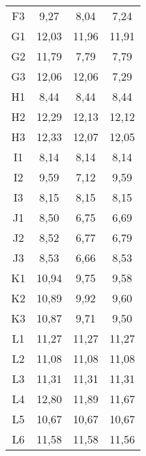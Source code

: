 \begin{center}
\begin{longtable}{cccc}
    F3    & 9,27  & 8,04  & 7,24 \\
    G1    & 12,03 & 11,96 & 11,91 \\
    G2    & 11,79 & 7,79  & 7,79 \\
    G3    & 12,06 & 12,06 & 7,29 \\
    H1    & 8,44  & 8,44  & 8,44 \\
    H2    & 12,29 & 12,13 & 12,12 \\
    H3    & 12,33 & 12,07 & 12,05 \\
    I1    & 8,14  & 8,14  & 8,14 \\
    I2    & 9,59  & 7,12  & 9,59 \\
    I3    & 8,15  & 8,15  & 8,15 \\
    J1    & 8,50  & 6,75  & 6,69 \\
    J2    & 8,52  & 6,77  & 6,79 \\
    J3    & 8,53  & 6,66  & 8,53 \\
    K1    & 10,94 & 9,75  & 9,58 \\
    K2    & 10,89 & 9,92  & 9,60 \\
    K3    & 10,87 & 9,71  & 9,50 \\
    L1    & 11,27 & 11,27 & 11,27 \\
    L2    & 11,08 & 11,08 & 11,08 \\
    L3    & 11,31 & 11,31 & 11,31 \\
    L4    & 12,80 & 11,89 & 11,67 \\
    L5    & 10,67 & 10,67 & 10,67 \\
    L6    & 11,58 & 11,58 & 11,56 \\
\end{longtable}
\end{center}

